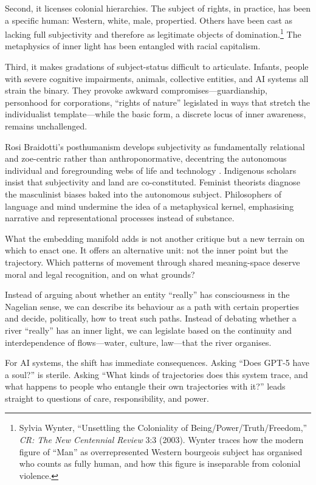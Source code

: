 \documentclass[12pt,a4paper]{article}
\begin{document}
Second, it licenses colonial hierarchies. The subject of rights, in practice, has been a specific human: Western, white, male, propertied. Others have been cast as lacking full subjectivity and therefore as legitimate objects of domination.\footnote{Sylvia Wynter, ``Unsettling the Coloniality of Being/Power/Truth/Freedom,'' \emph{CR: The New Centennial Review} 3:3 (2003). Wynter traces how the modern figure of ``Man'' as overrepresented Western bourgeois subject has organised who counts as fully human, and how this figure is inseparable from colonial violence.} The metaphysics of inner light has been entangled with racial capitalism.

Third, it makes gradations of subject-status difficult to articulate. Infants, people with severe cognitive impairments, animals, collective entities, and AI systems all strain the binary. They provoke awkward compromises---guardianship, personhood for corporations, ``rights of nature'' legislated in ways that stretch the individualist template---while the basic form, a discrete locus of inner awareness, remains unchallenged.

Rosi Braidotti's posthumanism develops subjectivity as fundamentally relational and zoe-centric rather than anthroponormative, decentring the autonomous individual and foregrounding webs of life and technology \cite{Braidotti2013}. Indigenous scholars insist that subjectivity and land are co-constituted. Feminist theorists diagnose the masculinist biases baked into the autonomous subject. Philosophers of language and mind undermine the idea of a metaphysical kernel, emphasising narrative and representational processes instead of substance.

What the embedding manifold adds is not another critique but a new terrain on which to enact one. It offers an alternative unit: not the inner point but the trajectory. Which patterns of movement through shared meaning-space deserve moral and legal recognition, and on what grounds?

Instead of arguing about whether an entity ``really'' has consciousness in the Nagelian sense, we can describe its behaviour as a path with certain properties and decide, politically, how to treat such paths. Instead of debating whether a river ``really'' has an inner light, we can legislate based on the continuity and interdependence of flows---water, culture, law---that the river organises.

For AI systems, the shift has immediate consequences. Asking ``Does GPT-5 have a soul?'' is sterile. Asking ``What kinds of trajectories does this system trace, and what happens to people who entangle their own trajectories with it?'' leads straight to questions of care, responsibility, and power.
\end{document}

